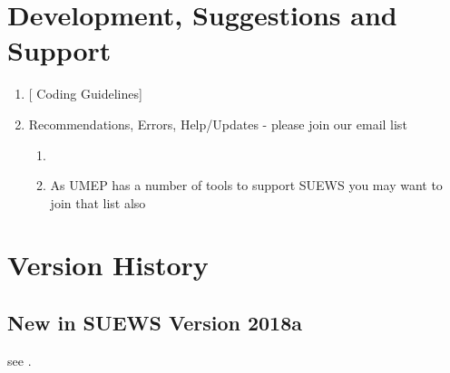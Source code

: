\documentclass[letterpaper,10pt,english]{sphinxmanual}
\begin{document}
\chapter{Development, Suggestions and Support}
\label{\detokenize{development::doc}}\label{\detokenize{development:urban-multi-scale-environmental-predictor}}\label{\detokenize{development:development-suggestions-and-support}}\begin{enumerate}
\item {} 
{[}\textbar{}
Coding Guidelines{]}

\item {} 
Recommendations, Errors, Help/Updates - please join our email list
\begin{enumerate}
\item {} 

\item {} 
As UMEP has a number of tools to support SUEWS you may want to
join that list also

\end{enumerate}

\end{enumerate}


\chapter{Version History}
\label{\detokenize{version-history:version-history}}\label{\detokenize{version-history::doc}}\label{\detokenize{version-history:id1}}

\section{New in SUEWS Version 2018a}
\label{\detokenize{version-history:new-latest}}\label{\detokenize{version-history:new-in-suews-version-2018a}}
see {\hyperref[\detokenize{version-history:version-history}]{}}.
\end{document}
